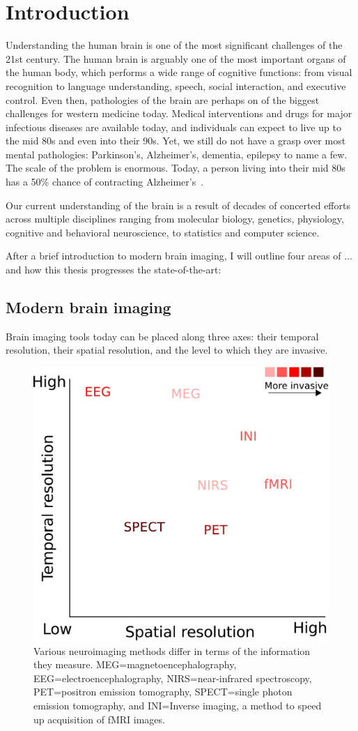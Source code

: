 \chapter{Introduction}

Understanding the human brain is one of the most significant challenges of the 21st century. The human brain is arguably one of the most important organs of the human body, which performs a wide range of cognitive functions: from visual recognition to language understanding, speech, social interaction, and executive control. Even then, pathologies of the brain are perhaps on of the biggest challenges for western medicine today. Medical interventions and drugs for major infectious diseases are available today, and individuals can expect to live up to the mid 80s and even into their 90s. Yet, we still do not have a grasp over most mental pathologies: Parkinson's, Alzheimer's, dementia, epilepsy to name a few. The scale of the problem is enormous. Today, a person living into their mid 80s has a 50\% chance of contracting Alzheimer's~\citep{alzheimer20162016}.

Our current understanding of the brain is a result of decades of concerted efforts across multiple disciplines ranging from molecular biology, genetics, physiology, cognitive and behavioral neuroscience, to statistics and computer science.

After a brief introduction to modern brain imaging, I will outline four areas of ... and how this thesis progresses the state-of-the-art:
 
\section{Modern brain imaging}
Brain imaging tools today can be placed along three axes: their temporal resolution, their spatial resolution, and the level to which they are invasive.

\begin{figure}[htb]
\begin{center}
   \includegraphics[width=0.4\linewidth]{figures/neuroimaging_methods.pdf}
\end{center}
   \caption[Various neuroimaging methods differ in terms of the information they measure.]{Various neuroimaging methods differ in terms of the information they measure. MEG=magnetoencephalography, EEG=electroencephalography, NIRS=near-infrared spectroscopy, PET=positron emission tomography, SPECT=single photon emission tomography, and INI=Inverse imaging, a method to speed up acquisition of fMRI images.}
   \label{fig:neuroimaging_methods}
\end{figure}

